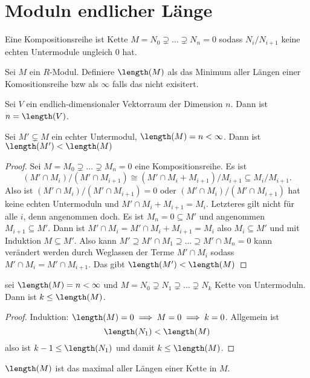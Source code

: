 \section{Moduln endlicher Länge}
\begin{Def}
	Eine Kompositionsreihe ist Kette \(M=N_0\supsetneq \dots \supsetneq N_n=0\) sodass \(N_i/N_{i+1}\) keine echten Untermodule ungleich \(0\) hat.
\end{Def}
\begin{Def}
	Sei \(M\) ein \(R\)-Modul. Definiere 
	\(\length(M)\) als das Minimum aller Längen einer Komositionsreihe bzw als \(\infty\) falls das nicht exisitert.
\end{Def}
\begin{Bsp}
	Sei \(V\) ein endlich-dimensionaler Vektorraum der Dimension \(n\). Dann ist \(n=\length(V)\).
\end{Bsp}
\begin{Lemma}
	Sei \(M'\subsetneq M\) ein echter Untermodul, \(\length(M)=n<\infty\). Dann ist \(\length(M')<\length(M)\)
\end{Lemma}
\begin{proof}
	Sei \(M=M_0\supsetneq \dots\supsetneq M_n=0\) eine Kompositionsreihe. Es ist \[(M'\cap M_i)/(M'\cap M_{i+1})\cong (M'\cap M_i+M_{i+1})/M_{i+1}\subseteq M_i/M_{i+1}.\]
	Also ist \((M'\cap M_i)/(M'\cap M_{i+1})=0\) oder \((M'\cap M_i)/(M'\cap M_{i+1})\) hat keine echten Untermoduln und \(M'\cap M_i+M_{i+1}=M_i\).
	Letzteres gilt nicht für alle \(i\), denn angenommen doch. Es ist \(M_n=0\subseteq M'\) und angenommen \(M_{i+1}\subseteq M'\). Dann ist \(M'\cap M_i=M'\cap M_i+M_{i+1}=M_i\) also \(M_i\subseteq M'\) und mit Induktion \(M\subseteq M'\).
	Also kann \(M'\supseteq M'\cap M_1\supseteq\dots \supseteq M'\cap M_n=0\) kann verändert werden durch Weglassen der Terme \(M'\cap M_i\) sodass \(M'\cap M_i=M'\cap M_{i+1}\). Das gibt \(\length(M')<\length(M)\)
\end{proof}
\begin{Lemma}
	sei \(\length(M)=n<\infty\) und \(M=N_0\supsetneq N_1\supsetneq\dots\supsetneq N_k\) Kette von Untermoduln. Dann ist \(k\leq \length(M)\). 
\end{Lemma}
\begin{proof}
	Induktion: \(\length(M)=0\implies M=0\implies k=0\).
	Allgemein ist \[\length(N_1)<\length(M)\] also ist \(k-1\leq \length(N_1)\) und damit \(k\leq \length(M)\).
\end{proof}
\begin{Kor}
	\(\length(M)\) ist das maximal aller Längen einer Kette in \(M\).
\end{Kor}
